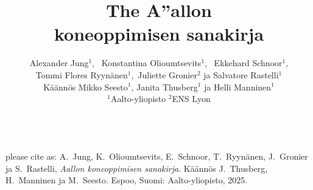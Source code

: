 \documentclass[journal,12pt,onecolumn]{article}
\begin{document}

\title {\vspace*{10mm}
	{\huge {\bf The {\fontsize{40}{48}\selectfont \textbf{\textsf{A\hspace*{-2mm}''}}}\hspace*{-4mm}allon \\ koneoppimisen sanakirja}}  \\[-5mm] 
}



\author{\hspace{-2mm}Alexander Jung${}^{1}$, \ Konstantina Olioumtsevits${}^{1}$, \ Ekkehard Schnoor${}^{1}$, \\[-2mm]
	Tommi Flores Ryynänen${}^{1}$,\ Juliette Gronier${}^{2}$ ja Salvatore Rastelli${}^{1}$ \\[-2mm]
	Käännös Mikko Seesto${}^{1}$, Janita Thusberg${}^{1}$ ja Helli Manninen${}^{1}$ \\[-2mm]
	${}^{1}$Aalto-yliopisto \quad ${}^{2}$ENS Lyon
}


\maketitle


\begin{center}
	\\[8mm]
	{\large	please cite as: A.\ Jung, K.\ Olioumtsevits, E.\ Schnoor, T.\ Ryynänen, J.\ Gronier ja S.\ Rastelli, \textit{Aallon koneoppimisen sanakirja}. Käännös J.\ Thusberg, H.\ Manninen ja M.\ Seesto. Espoo, Suomi: Aalto-yliopisto, 2025.}
\end{center}
\end{document}
